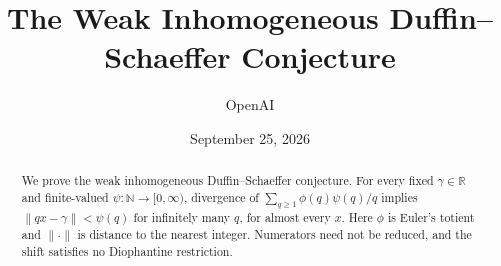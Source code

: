 \documentclass[11pt]{article}
\title{The Weak Inhomogeneous Duffin--Schaeffer Conjecture}
\author{OpenAI}
\date{September 25, 2026}
\theoremstyle{definition}
\theoremstyle{remark}
\numberwithin{equation}{section}
\begin{document}
\maketitle
\begin{abstract}
We prove the weak inhomogeneous Duffin--Schaeffer conjecture. For every
fixed $\gamma\in\mathbb R$ and finite-valued
$\psi:\mathbb N\to[0,\infty)$, divergence of
$\sum_{q\ge1}\phi(q)\psi(q)/q$ implies
$\|qx-\gamma\|<\psi(q)$ for infinitely many $q$, for almost every $x$.
Here $\phi$ is Euler's totient and $\|\cdot\|$ is distance to the nearest integer.
Numerators need not be reduced, and the shift satisfies no Diophantine
restriction.
\end{abstract}
\tableofcontents
\clearpage















\end{document}
